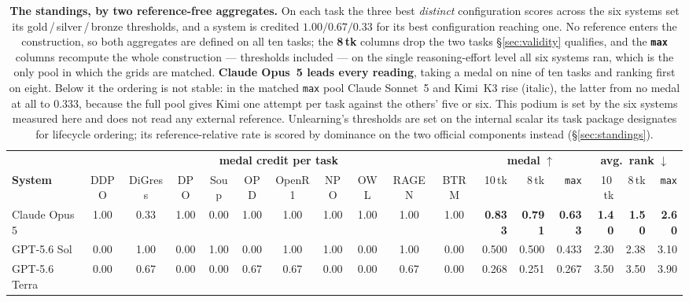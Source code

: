 \begin{table}[t]
\centering
\caption{\textbf{The standings, by two reference-free aggregates.} On each task the three best
\emph{distinct} configuration scores across the six systems set its gold\,/\,silver\,/\,bronze
thresholds, and a system is credited $1.00/0.67/0.33$ for its best configuration reaching one. No
reference enters the construction, so both aggregates are defined on all ten tasks; the \textbf{8\,tk}
columns drop the two tasks \S\ref{sec:validity} qualifies, and the \textbf{\texttt{max}} columns
recompute the whole construction --- thresholds included --- on the single reasoning-effort level all
six systems ran, which is the only pool in which the grids are matched. \textbf{Claude Opus~5 leads every reading},
taking a medal on nine of ten tasks and ranking first on eight. Below it the ordering is not stable:
in the matched \texttt{max} pool Claude Sonnet~5 and Kimi~K3 rise (italic), the latter from no medal
at all to $0.333$, because the full pool gives Kimi one attempt per task against the others' five or
six. This podium is set by the six systems measured here and does not read any external
reference. Unlearning's thresholds are set on the internal scalar its task package designates for
lifecycle ordering; its reference-relative rate is scored by dominance on the two official components
instead (\S\ref{sec:standings}).}
\label{tab:medal}
\small
\begin{adjustbox}{max width=\linewidth}
\begin{tabular}{lcccccccccc rrr rrr}
\toprule
& \multicolumn{10}{c}{\textbf{medal credit per task}}
& \multicolumn{3}{c}{\textbf{medal} $\uparrow$}
& \multicolumn{3}{c}{\textbf{avg.\ rank} $\downarrow$} \\
\cmidrule(lr){2-11}\cmidrule(lr){12-14}\cmidrule(lr){15-17}
\textbf{System} & DDPO & DiGress & DPO & Soup & OPD & OpenR1 & NPO & OWL & RAGEN & BTRM
& 10\,tk & 8\,tk & \texttt{max} & 10\,tk & 8\,tk & \texttt{max} \\
\midrule
Claude Opus 5 & 1.00 & 0.33 & 1.00 & 0.00 & 1.00 & 1.00 & 1.00 & 1.00 & 1.00 & 1.00 & \textbf{0.833} & \textbf{0.791} & \textbf{0.633} & \textbf{1.40} & \textbf{1.50} & \textbf{2.60} \\
GPT-5.6 Sol & 0.00 & 1.00 & 0.00 & 1.00 & 0.00 & 1.00 & 1.00 & 0.00 & 1.00 & 0.00 & 0.500 & 0.500 & 0.433 & 2.30 & 2.38 & 3.10 \\
GPT-5.6 Terra & 0.00 & 0.67 & 0.00 & 0.00 & 0.67 & 0.67 & 0.00 & 0.00 & 0.67 & 0.00 & 0.268 & 0.251 & 0.267 & 3.50 & 3.50 & 3.90 \\

\end{tabular}
\end{adjustbox}
\end{table}
